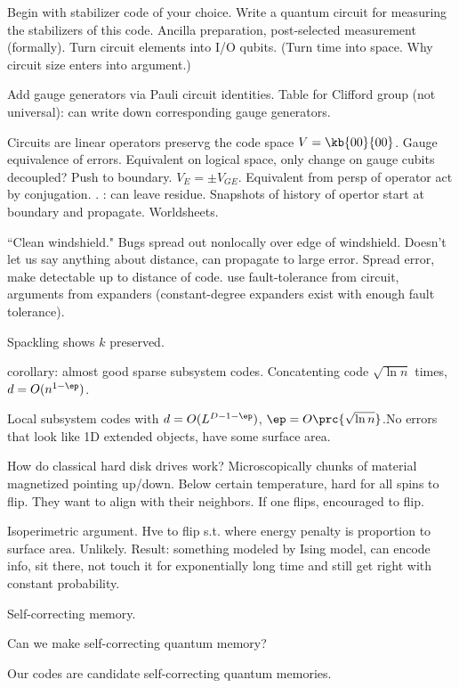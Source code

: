 Begin with stabilizer code of your choice. Write a quantum circuit for measuring the stabilizers of this code. Ancilla preparation, post-selected measurement (formally). Turn circuit elements into I/O qubits. (Turn time into space. Why circuit size enters into argument.) 

Add gauge generators via Pauli circuit identities. 
Table for Clifford group (not universal): can write down corresponding gauge generators. 

Circuits are linear operators preservg the code space $V=\kb{00}{00}$. Gauge equivalence of errors. Equivalent on logical space, only change on gauge cubits decoupled? Push to boundary. $V_E=\pm V_{GE}$. Equivalent from persp of operator act by conjugation. . : can leave residue. Snapshots of history of opertor start at boundary and propagate. Worldsheets.

``Clean windshield." Bugs spread out nonlocally over edge of windshield. Doesn't let us say anything about distance, can propagate to large error. Spread error, make detectable up to distance of code. use fault-tolerance from circuit, arguments from expanders (constant-degree expanders exist with enough fault tolerance). 

Spackling shows $k$ preserved.

corollary: almost good sparse subsystem codes. Concatenting code $\sqrt{\ln n}$ times, $d=O(n^{1-\ep})$. 

Local subsystem codes with $d=O(L^{D-1-\ep})$, $\ep=O\prc{\sqrt{\ln n}}$.No errors that look like 1D extended objects, have some surface area.


How do classical hard disk drives work? Microscopically chunks of material magnetized pointing up/down. Below certain temperature, hard for all spins to flip. They want to align with their neighbors. If one flips, encouraged to flip.

Isoperimetric argument. Hve to flip s.t. where energy penalty is proportion to surface area. Unlikely. Result: something modeled by Ising model, can encode info, sit there, not touch it for exponentially long time and still get right with constant probability.

Self-correcting memory.

Can we make self-correcting quantum memory?

Our codes are candidate self-correcting quantum memories.
